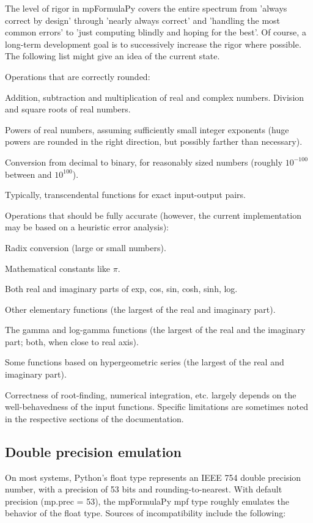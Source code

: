 \vpara
The level of rigor in mpFormulaPy covers the entire spectrum from 'always correct by design' through 'nearly always correct' and 'handling the most common errors' to 'just computing blindly and hoping for the best'. Of course, a long-term development goal is to successively
increase the rigor where possible. The following list might give an idea of the current state.

\vpara
Operations that are correctly rounded:

\vpara
Addition, subtraction and multiplication of real and complex numbers.
Division and square roots of real numbers.

Powers of real numbers, assuming sufficiently small integer exponents (huge powers are rounded in the right direction, but possibly farther than necessary).

Conversion from decimal to binary, for reasonably sized numbers (roughly $10^{-100}$ between and $10^{100}$).

Typically, transcendental functions for exact input-output pairs.

\vpara
Operations that should be fully accurate (however, the current implementation may be based on a heuristic error analysis):

\vpara
Radix conversion (large or small numbers).

Mathematical constants like $\pi$.

Both real and imaginary parts of exp, cos, sin, cosh, sinh, log.

Other elementary functions (the largest of the real and imaginary part).

The gamma and log-gamma functions (the largest of the real and the imaginary part; both, when close to real axis).

Some functions based on hypergeometric series (the largest of the real and imaginary part).

\vpara
Correctness of root-finding, numerical integration, etc. largely depends on the well-behavedness of the input functions. Specific limitations are sometimes noted in the respective sections of the documentation.



\subsection{Double precision emulation}

On most systems, Python's float type represents an IEEE 754 double precision number, with a precision of 53 bits and rounding-to-nearest. With default precision (mp.prec = 53), the mpFormulaPy mpf type roughly emulates the behavior of the float type. Sources of incompatibility
include the following:

